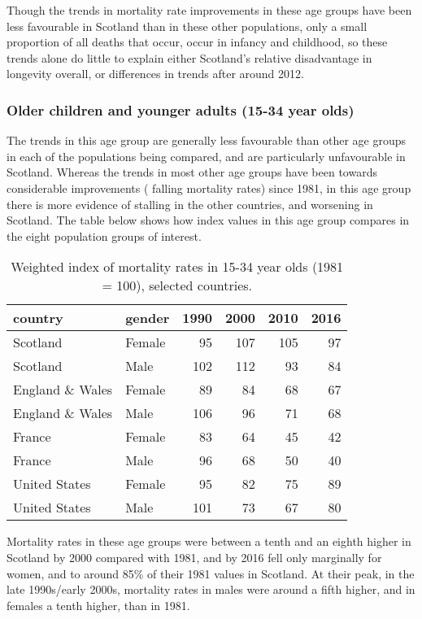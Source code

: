 \documentclass[]{article}
\begin{document}
Though the trends in mortality rate improvements in these age groups
have been less favourable in Scotland than in these other populations,
only a small proportion of all deaths that occur, occur in infancy and
childhood, so these trends alone do little to explain either Scotland's
relative disadvantage in longevity overall, or differences in trends
after around 2012.

\subsubsection{Older children and younger adults (15-34 year
olds)}\label{older-children-and-younger-adults-15-34-year-olds}

The trends in this age group are generally less favourable than other
age groups in each of the populations being compared, and are
particularly unfavourable in Scotland. Whereas the trends in most other
age groups have been towards considerable improvements ( falling
mortality rates) since 1981, in this age group there is more evidence of
stalling in the other countries, and worsening in Scotland. The table
below shows how index values in this age group compares in the eight
population groups of interest.

\begin{table}

\caption{\label{tab:unnamed-chunk-6}Weighted index of mortality rates in 15-34 year olds (1981 = 100), selected countries.}
\centering
\begin{tabular}[t]{l|l|r|r|r|r}
\hline
country & gender & 1990 & 2000 & 2010 & 2016\\
\hline
Scotland & Female & 95 & 107 & 105 & 97\\
\hline
Scotland & Male & 102 & 112 & 93 & 84\\
\hline
England \& Wales & Female & 89 & 84 & 68 & 67\\
\hline
England \& Wales & Male & 106 & 96 & 71 & 68\\
\hline
France & Female & 83 & 64 & 45 & 42\\
\hline
France & Male & 96 & 68 & 50 & 40\\
\hline
United States & Female & 95 & 82 & 75 & 89\\
\hline
United States & Male & 101 & 73 & 67 & 80\\
\hline
\end{tabular}
\end{table}

Mortality rates in these age groups were between a tenth and an eighth
higher in Scotland by 2000 compared with 1981, and by 2016 fell only
marginally for women, and to around 85\% of their 1981 values in
Scotland. At their peak, in the late 1990s/early 2000s, mortality rates
in males were around a fifth higher, and in females a tenth higher, than
in 1981.
\end{document}
